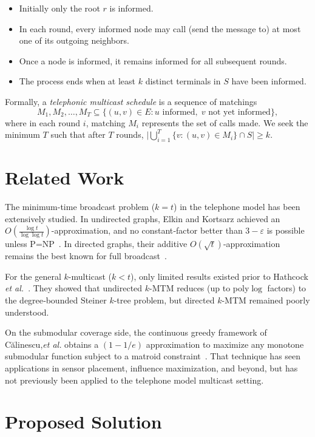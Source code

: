 \documentclass[12pt]{article}
\begin{document}
\begin{itemize}
  \item Initially only the root \(r\) is informed.
  \item In each round, every informed node may call (send the message to) at most one of its outgoing neighbors.
  \item Once a node is informed, it remains informed for all subsequent rounds.
  \item The process ends when at least \(k\) distinct terminals in \(S\) have been informed.
\end{itemize}

Formally, a \emph{telephonic multicast schedule} is a sequence of matchings
\[
  M_1, M_2, \dots, M_T
  \subseteq \bigl\{(u,v)\in E : u\text{ informed},\;v\text{ not yet informed}\bigr\},
\]
where in each round \(i\), matching \(M_i\) represents the set of calls made.  We seek the minimum \(T\) such that after \(T\) rounds, \(\bigl|\bigcup_{i=1}^T\{v:(u,v)\in M_i\}\cap S\bigr|\ge k\).

\section{Related Work}
The minimum-time broadcast problem (\(k=t\)) in the telephone model has been extensively studied.  In undirected graphs, Elkin and Kortsarz achieved an \(O(\tfrac{\log t}{\log\log t})\)-approximation, and no constant‐factor better than \(3-\varepsilon\) is possible unless P=NP~\cite{EK06b,EK05}.  In directed graphs, their additive \(O(\sqrt{t})\)-approximation remains the best known for full broadcast~\cite{EK06a}.  

For the general \(k\)-multicast (\(k<t\)), only limited results existed prior to Hathcock\,\emph{et al.}~\cite{Hathcock2024}.  They showed that undirected \(k\)-MTM reduces (up to poly\(\log\) factors) to the degree‐bounded Steiner \(k\)-tree problem, but directed \(k\)-MTM remained poorly understood.  

On the submodular coverage side, the continuous greedy framework of Călinescu,\emph{et al.} obtains a \((1-1/e)\) approximation to maximize any monotone submodular function subject to a matroid constraint~\cite{CCPV11}.  That technique has seen applications in sensor placement, influence maximization, and beyond, but has not previously been applied to the telephone model multicast setting.  

\section{Proposed Solution}
\label{sec:solution}
\end{document}
